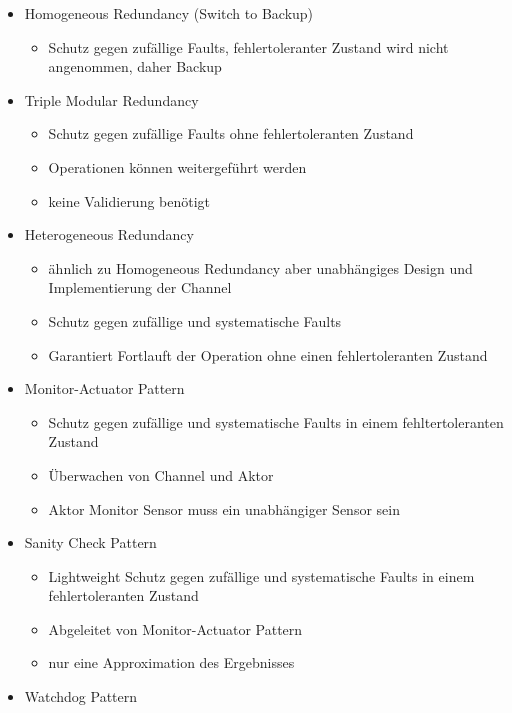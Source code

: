 \documentclass[paper=a4, fontsize=11pt]{scrartcl} %
\numberwithin{equation}{section} %
\numberwithin{figure}{section} %
\numberwithin{table}{section} %
\begin{document}
\begin{itemize}
\begin{itemize}
\begin{itemize}
    \end{itemize}
    \item Homogeneous Redundancy (Switch to Backup)
    \begin{itemize}
      \item Schutz gegen zufällige Faults, fehlertoleranter Zustand wird nicht angenommen, daher Backup
    \end{itemize}
    \item Triple Modular Redundancy
    \begin{itemize}
      \item Schutz gegen zufällige Faults ohne fehlertoleranten Zustand
      \item Operationen können weitergeführt werden
      \item keine Validierung benötigt
    \end{itemize}
    \item Heterogeneous Redundancy
    \begin{itemize}
      \item ähnlich zu Homogeneous Redundancy aber unabhängiges Design und Implementierung der Channel
      \item Schutz gegen zufällige und systematische Faults
      \item Garantiert Fortlauft der Operation ohne einen fehlertoleranten Zustand
    \end{itemize}
    \item Monitor-Actuator Pattern
    \begin{itemize}
      \item Schutz gegen zufällige und systematische Faults in einem fehltertoleranten Zustand
      \item Überwachen von Channel und Aktor
      \item Aktor Monitor Sensor muss ein unabhängiger Sensor sein
    \end{itemize}
    \item Sanity Check Pattern
    \begin{itemize}
      \item Lightweight Schutz gegen zufällige und systematische Faults in einem fehlertoleranten Zustand
      \item Abgeleitet von Monitor-Actuator Pattern
      \item nur eine Approximation des Ergebnisses
    \end{itemize}
    \item Watchdog Pattern
    \begin{itemize}

\end{itemize}
\end{itemize}
\end{itemize}
\end{document}
